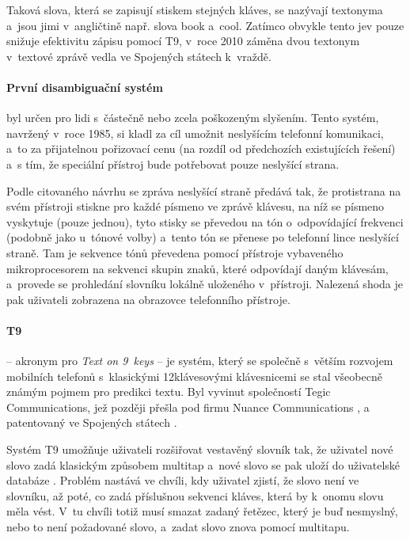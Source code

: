 \documentclass[a4paper,11pt,openany]{book} %
\newcommand\exmp{\textsf}
\begin{document}
Taková slova, která se zapisují stiskem stejných kláves, se nazývají textonyma \parencite{ericzorn2007} a~jsou jimi v~angličtině např. slova \exmp{book} a~\exmp{cool}. Zatímco obvykle tento jev pouze snižuje efektivitu zápisu pomocí T9, v~roce 2010 záměna dvou textonym v~textové zprávě vedla ve Spojených státech k~vraždě. \parencite{t9kill}

\paragraph{První disambiguační systém} byl určen pro lidi s~částečně nebo zcela poškozeným slyšením. Tento systém, navržený v~roce 1985, si kladl za cíl umožnit neslyšícím telefonní komunikaci, a~to za přijatelnou pořizovací cenu (na rozdíl od předchozích existujících řešení) a~s tím, že speciální přístroj bude potřebovat pouze neslyšící strana. \parencite{feinson1988interpretive}

Podle citovaného návrhu se zpráva neslyšící straně předává tak, že protistrana na svém přístroji stiskne pro každé písmeno ve zprávě klávesu, na níž se písmeno vyskytuje (pouze jednou), tyto stisky se převedou na tón o~odpovídající frekvenci (podobně jako u~tónové volby) a~tento tón se přenese po telefonní lince neslyšící straně. Tam je sekvence tónů převedena pomocí přístroje vybaveného mikroprocesorem na sekvenci skupin znaků, které odpovídají daným klávesám, a~provede se prohledání slovníku lokálně uloženého v~přístroji. Nalezená shoda je pak uživateli zobrazena na obrazovce telefonního přístroje.

\paragraph{T9}\label{t9}
 -- akronym pro {\it Text on 9~keys} -- je systém, který se společně s~větším rozvojem mobilních telefonů s~klasickými 12klávesovými klávesnicemi se stal všeobecně známým pojmem pro predikci textu. Byl vyvinut společností Tegic Communications, jež později přešla pod firmu Nuance Communications \parencite{nuancecommunications2007}, a patentovaný ve Spojených státech \parencite{grover1998reduced}. 

Systém T9 umožňuje uživateli rozšiřovat vestavěný slovník tak, že uživatel nové slovo zadá klasickým způsobem multitap a~nové slovo se pak uloží do uživatelské databáze \parencite{t9about}. %
Problém nastává ve chvíli, kdy uživatel zjistí, že slovo není ve slovníku, až poté, co zadá příslušnou sekvenci kláves, která by k~onomu slovu měla vést. V~tu chvíli totiž musí smazat zadaný řetězec, který je buď nesmyslný, nebo to není požadované slovo, a~zadat slovo znova pomocí multitapu.
\end{document}
